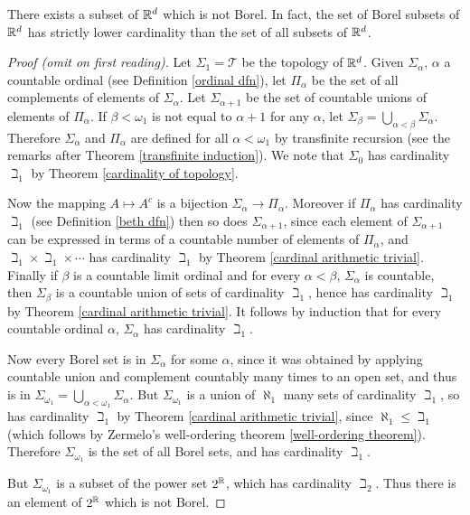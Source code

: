 \begin{lemma}
\label{Borel sigma algebra}
There exists a subset of $\mathbb{R}^d$ which is not Borel.
In fact, the set of Borel subsets of $\mathbb{R}^d$ has strictly lower cardinality than the set of all subsets of $\mathbb{R}^d$.
\end{lemma}
\begin{proof}[Proof (omit on first reading)]
Let $\Sigma_1 = \mathcal T$ be the topology of $\mathbb{R}^d$.
Given $\Sigma_\alpha$, $\alpha$ a countable ordinal (see Definition \ref{ordinal dfn}), let $\Pi_\alpha$ be the set of all complements of elements of $\Sigma_\alpha$.
Let $\Sigma_{\alpha+1}$ be the set of countable unions of elements of $\Pi_\alpha$.
If $\beta < \omega_1$ is not equal to $\alpha+1$ for any $\alpha$, let $\Sigma_\beta = \bigcup_{\alpha < \beta} \Sigma_\alpha$.
Therefore $\Sigma_\alpha$ and $\Pi_\alpha$ are defined for all $\alpha < \omega_1$ by transfinite recursion (see the remarks after Theorem \ref{transfinite induction}).
We note that $\Sigma_0$ has cardinality $\beth_1$ by Theorem \ref{cardinality of topology}.

Now the mapping $A \mapsto A^c$ is a bijection $\Sigma_\alpha \to \Pi_\alpha$.
Moreover if $\Pi_\alpha$ has cardinality $\beth_1$ (see Definition \ref{beth dfn}) then so does $\Sigma_{\alpha+1}$, since each element of $\Sigma_{\alpha+1}$ can be expressed in terms of a countable number of elements of $\Pi_\alpha$, and $\beth_1 \times \beth_1 \times \cdots$ has cardinality $\beth_1$ by Theorem \ref{cardinal arithmetic trivial}.
Finally if $\beta$ is a countable limit ordinal and for every $\alpha < \beta$, $\Sigma_\alpha$ is countable, then $\Sigma_\beta$ is a countable union of sets of cardinality $\beth_1$, hence has cardinality $\beth_1$ by Theorem \ref{cardinal arithmetic trivial}.
It follows by induction that for every countable ordinal $\alpha$, $\Sigma_\alpha$ has cardinality $\beth_1$.

Now every Borel set is in $\Sigma_\alpha$ for some $\alpha$, since it was obtained by applying countable union and complement countably many times to an open set, and thus is in $\Sigma_{\omega_1} = \bigcup_{\alpha < \omega_1} \Sigma_\alpha$.
But $\Sigma_{\omega_1}$ is a union of $\aleph_1$ many sets of cardinality $\beth_1$, so has cardinality $\beth_1$ by Theorem \ref{cardinal arithmetic trivial},
since $\aleph_1 \leq \beth_1$ (which follows by Zermelo's well-ordering theorem \ref{well-ordering theorem}).
Therefore $\Sigma_{\omega_1}$ is the set of all Borel sets, and has cardinality $\beth_1$.

But $\Sigma_{\omega_1}$ is a subset of the power set $2^{\mathbb{R}}$, which has cardinality $\beth_2$. Thus there is an element of $2^{\mathbb{R}}$ which is not Borel.
\end{proof}

